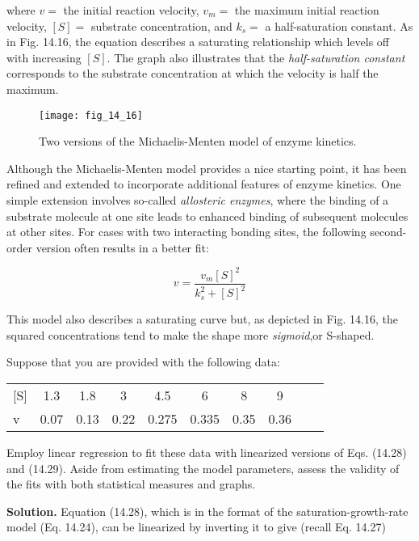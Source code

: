 \documentclass[../main.tex]{subfiles}
\begin{document}
\noindent where $v =$ the initial reaction velocity, $v_m =$ the maximum initial reaction velocity, $[S] =$ substrate concentration, and $k_s =$ a half-saturation constant. As in Fig. 14.16, the equation describes a saturating relationship which levels off with increasing $[S]$. The graph also illustrates that the \textit{half-saturation constant} corresponds to the substrate concentration at which the velocity is half the maximum.

\begin{figure}[H] %
	\centering
	\texttt{[image: fig\_14\_16]}
	\caption{\textsf{Two versions of the Michaelis-Menten model of enzyme kinetics.}}
	\label{fig:fig_14_16}
\end{figure}

Although the Michaelis-Menten model provides a nice starting point, it has been refined and extended to incorporate additional features of enzyme kinetics. One simple extension involves so-called \textit{allosteric enzymes}, where the binding of a substrate molecule at one site leads to enhanced binding of subsequent molecules at other sites. For cases with two interacting bonding sites, the following second-order version often results in a better fit:

\begin{equation}
	\tag{14.29}
	v = \frac{v_m {[S]}^2}{k^2_s + {[S]}^2}
\end{equation}

\noindent This model also describes a saturating curve but, as depicted in Fig. 14.16, the squared concentrations tend to make the shape more \textit{sigmoid},or S-shaped.

Suppose that you are provided with the following data:

\begin{tabular}{l c c c c c c c c c}
	[S] &1.3 & 1.8 & 3  &  4.5  & 6  &   8   & 9 \\
	v  & 0.07 &0.13 &0.22 &0.275& 0.335& 0.35 &0.36
\end{tabular}

\noindent Employ linear regression to fit these data with linearized versions of Eqs. (14.28) and (14.29). Aside from estimating the model parameters, assess the validity of the fits with both statistical measures and graphs.

\textbf{Solution.} Equation (14.28), which is in the format of the saturation-growth-rate model (Eq. 14.24), can be linearized by inverting it to give (recall Eq. 14.27)
\end{document}
